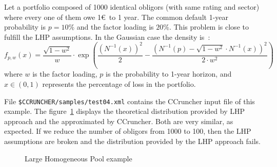 \documentclass[11pt,fleqn]{book} %
\begin{document}
\begin{example}
	\label{ex:test04}
	Let a portfolio composed of 1000 identical obligors (with same rating 
	and sector) where every one of them owe 1\euro\ to 1 year. The common default 
	1-year probability is $p=10\%$ and the factor loading is $20\%$. This 
	problem is close to fulfill the LHP assumptions. In the Gaussian case the 
	density is~\cite[chap. 2.5]{bluhm:2002}: 
	\begin{displaymath}
		f_{p,w}(x) = 
		\frac{\sqrt{1-w^2}}{w} \cdot \exp\left( 
			\frac{\left(N^{-1}(x)\right)^2}{2} -
			\frac{\left(N^{-1}(p) - \sqrt{1-w^2} \cdot N^{-1}(x)\right)^2}{2 \cdot w^2}
		\right)
	\end{displaymath}
	where $w$ is the factor loading, $p$ is the probability to 1-year horizon, 
	and $x \in (0,1)$ represents the percentage of loss in the portfolio. 

	File \texttt{\$CCRUNCHER/samples/test04.xml} contains the CCruncher input
	file of this example. The figure~\ref{fig:test04} displays the theoretical
	distribution provided by LHP approach and the approximated by CCruncher.
	Both are very similar, as expected. If we reduce the number of obligors from
	1000 to 100, then the LHP assumptions are broken and the distribution 
	provided by the LHP approach fails.
	\begin{figure}[!ht]
		\centering
		\caption{Large Homogeneous Pool example}
		\label{fig:test04} 
	\end{figure}
\end{example}

\end{document}
